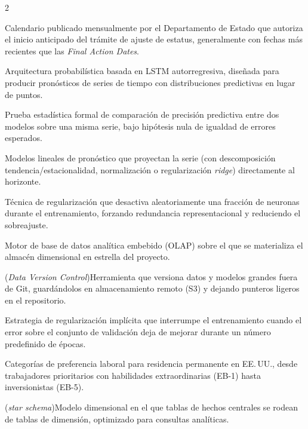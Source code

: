 \documentclass[12pt,letterpaper]{report}
\begin{document}
\begin{multicols}{2}
\begin{description}[leftmargin=0pt, labelindent=0pt, itemindent=0pt,
                    labelsep=0.4em, font=\bfseries\scriptsize,
                    itemsep=2pt, parsep=0pt, topsep=0pt]
    \item[Dates for Filing] Calendario publicado mensualmente por el Departamento de Estado que autoriza el inicio anticipado del trámite de ajuste de estatus, generalmente con fechas más recientes que las \textit{Final Action Dates}.

    \item[DeepAR] Arquitectura probabilística basada en LSTM autorregresiva, diseñada para producir pronósticos de series de tiempo con distribuciones predictivas en lugar de puntos.

    \item[Diebold-Mariano (prueba)] Prueba estadística formal de comparación de precisión predictiva entre dos modelos sobre una misma serie, bajo hipótesis nula de igualdad de errores esperados.

    \item[DLinear / NLinear / RLinear] Modelos lineales de pronóstico que proyectan la serie (con descomposición tendencia/estacionalidad, normalización o regularización \textit{ridge}) directamente al horizonte.

    \item[Dropout] Técnica de regularización que desactiva aleatoriamente una fracción de neuronas durante el entrenamiento, forzando redundancia representacional y reduciendo el sobreajuste.

    \item[DuckDB] Motor de base de datos analítica embebido (OLAP) sobre el que se materializa el almacén dimensional en estrella del proyecto.

    \item[DVC] (\textit{Data Version Control})\hspace{0.3em}Herramienta que versiona datos y modelos grandes fuera de Git, guardándolos en almacenamiento remoto (S3) y dejando punteros ligeros en el repositorio.

    \item[Early Stopping] Estrategia de regularización implícita que interrumpe el entrenamiento cuando el error sobre el conjunto de validación deja de mejorar durante un número predefinido de épocas.

    \item[EB-1 a EB-5] Categorías de preferencia laboral para residencia permanente en EE.\,UU., desde trabajadores prioritarios con habilidades extraordinarias (EB-1) hasta inversionistas (EB-5).

    \item[Esquema en estrella] (\textit{star schema})\hspace{0.3em}Modelo dimensional en el que tablas de hechos centrales se rodean de tablas de dimensión, optimizado para consultas analíticas.


\end{description}
\end{multicols}
\end{document}
